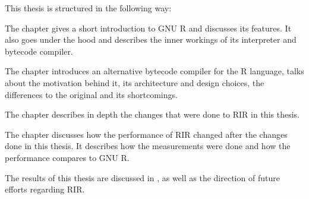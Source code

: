 \blind[2]

This thesis is structured in the following way:

The chapter \emph{} gives a short introduction to GNU R and discusses its features. It also goes under the hood and describes the inner workings of its interpreter and bytecode compiler.

The chapter \emph{} introduces an alternative bytecode compiler for the R language, talks about the motivation behind it, its architecture and design choices, the differences to the original and its shortcomings.

The chapter \emph{} describes in depth the changes that were done to RIR in this thesis.\todo[?]

The chapter \emph{} discusses how the performance of RIR changed after the changes done in this thesis. It describes how the measurements were done and how the performance compares to GNU R.\todo[?]

The results of this thesis are discussed in \emph{}, as well as the direction of future efforts regarding RIR.
